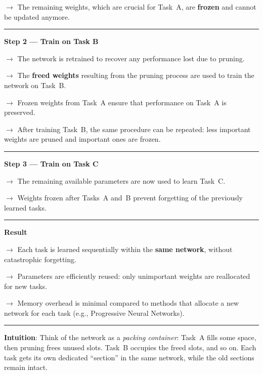 $\rightarrow$ The remaining weights, which are crucial for Task~A, are \textbf{frozen} and
cannot be updated anymore.

\vspace{0.3cm}
\hrule

\vspace{0.3cm}

\textbf{Step 2 --- Train on Task B}

$\rightarrow$ The network is retrained to recover any performance lost due to pruning.

$\rightarrow$ The \textbf{freed weights} resulting from the pruning process are used to train
the network on Task~B.

$\rightarrow$ Frozen weights from Task~A ensure that performance on Task~A is preserved.

$\rightarrow$ After training Task~B, the same procedure can be repeated: less important weights
are pruned and important ones are frozen.

\vspace{0.3cm}
\hrule
\vspace{0.3cm}

\textbf{Step 3 --- Train on Task C}

$\rightarrow$ The remaining available parameters are now used to learn Task~C.

$\rightarrow$ Weights frozen after Tasks~A and~B prevent forgetting of the previously learned
tasks.

\vspace{0.3cm}
\hrule
\vspace{0.3cm}

\textbf{Result}

$\rightarrow$ Each task is learned sequentially within the \textbf{same network}, without
catastrophic forgetting.

$\rightarrow$ Parameters are efficiently reused: only unimportant weights are reallocated for
new tasks.

$\rightarrow$ Memory overhead is minimal compared to methods that allocate a new network for
each task (e.g., Progressive Neural Networks).

\vspace{0.3cm}
\hrule
\vspace{0.3cm}

\textbf{Intuition}: Think of the network as a \emph{packing container}: Task~A fills some space, then pruning frees
unused slots. Task~B occupies the freed slots, and so on. Each task gets its own dedicated
``section'' in the same network, while the old sections remain intact.

